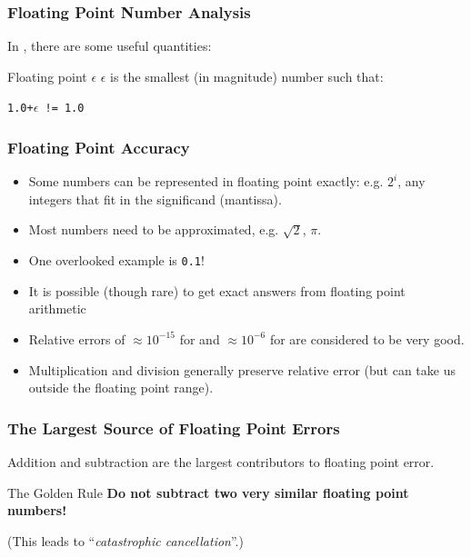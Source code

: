 \documentclass[smaller,handout,table]{beamer}
\begin{document}
\begin{frame}
\frametitle{Floating Point Number Analysis}
In , there are some useful quantities:

\begin{block}{Floating point $\epsilon$}
$\epsilon$ is the smallest (in magnitude) number such that:\\
\begin{center}
{\tt 1.0+$\epsilon$ != 1.0}
\end{center}
\end{block}
\end{frame}

\begin{frame}
\frametitle{Floating Point Accuracy}
\begin{itemize}
\item Some numbers can be represented in floating point exactly:
e.g. $2^i$, any integers that fit in the significand (mantissa).
\item Most numbers need to be approximated, e.g. $\sqrt{2}$, $\pi$.
\item One overlooked example is {\tt0.1}!
\item It is possible (though rare) to get exact answers from floating point arithmetic
\item Relative errors of $\approx10^{-15}$ for  and
$\approx10^{-6}$ for  are considered to be very good.
\item Multiplication and division generally preserve relative error (but can take us outside the floating point range).
\end{itemize}
\end{frame}

\begin{frame}
\frametitle{The Largest Source of Floating Point Errors}
Addition and subtraction are the largest contributors to floating point error.

\begin{alertblock}{The Golden Rule}
{\bf Do not subtract two very similar floating point numbers!}
\end{alertblock}

(This leads to ``\emph{catastrophic cancellation}''.)
\end{frame}
\end{document}

